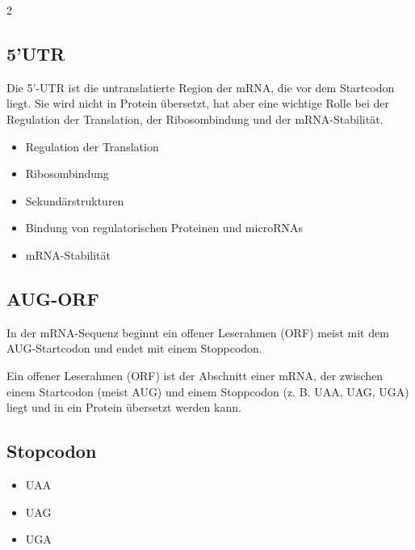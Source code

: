 \documentclass{article}
\begin{document}
\begin{multicols}{2}
\subsection{5'UTR}
\begin{mybox}[title=5'-untranslated region]
Die 5'-UTR ist die untranslatierte Region der mRNA, die vor dem Startcodon liegt. Sie wird nicht in Protein übersetzt, hat aber eine wichtige Rolle bei der Regulation der Translation, der Ribosombindung und der mRNA-Stabilität.
\end{mybox}
\begin{itemize}
    \item Regulation der Translation
    \item Ribosombindung
    \item Sekundärstrukturen
    \item Bindung von regulatorischen Proteinen und microRNAs
    \item mRNA-Stabilität
\end{itemize}

\subsection{AUG-ORF}
In der mRNA-Sequenz beginnt ein offener Leserahmen (ORF) meist mit dem AUG-Startcodon und endet mit einem Stoppcodon.
\begin{mybox}[title=ORF]
Ein offener Leserahmen (ORF) ist der Abschnitt einer mRNA, der zwischen einem Startcodon (meist AUG) und einem Stoppcodon (z. B. UAA, UAG, UGA) liegt und in ein Protein übersetzt werden kann.
\end{mybox}
\noindent 

\subsection{Stopcodon}
\begin{itemize}
    \item UAA
    \item UAG
    \item UGA
\end{itemize} 


\end{multicols}
\end{document}
